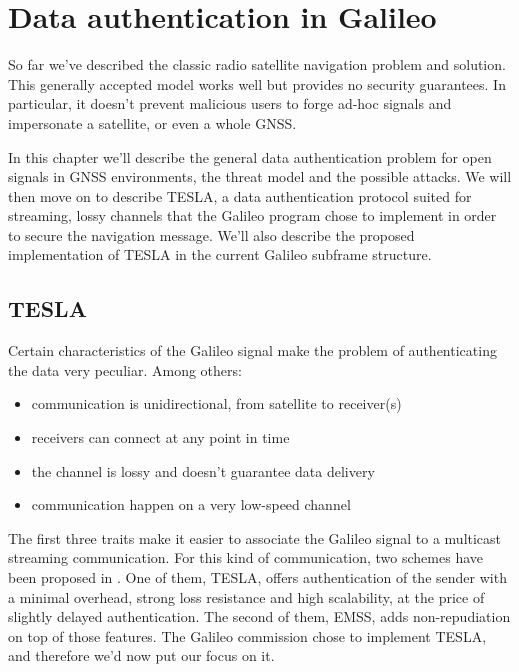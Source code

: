 
\chapter{Data authentication in Galileo}

So far we've described the classic radio satellite navigation problem and
solution. This generally accepted model works well but provides no security
guarantees. In particular, it doesn't prevent malicious users to forge ad-hoc
signals and impersonate a satellite, or even a whole GNSS.

In this chapter we'll describe the general data authentication problem for open
signals in GNSS environments, the threat model and the possible attacks. We will
then move on to describe TESLA, a data authentication protocol suited for
streaming, lossy channels that the Galileo program chose to implement in order
to secure the navigation message. We'll also describe the proposed
implementation of TESLA in the current Galileo subframe structure.

\section{TESLA}
Certain characteristics of the Galileo signal make the problem of authenticating
the data very peculiar. Among others:
\begin{itemize}
  \item communication is unidirectional, from satellite to receiver(s)
  \item receivers can connect at any point in time
  \item the channel is lossy and doesn't guarantee data delivery
  \item communication happen on a very low-speed channel
\end{itemize}
The first three traits make it easier to associate the Galileo signal to a
multicast streaming communication. For this kind of communication, two schemes
have been proposed in \cite{perrig}. One of them, TESLA, offers authentication
of the sender with a minimal overhead, strong loss resistance and high
scalability, at the price of slightly delayed authentication. The second of
them, EMSS, adds non-repudiation on top of those features. The Galileo
commission chose to implement TESLA, and therefore we'd now put our focus on it.

\par

